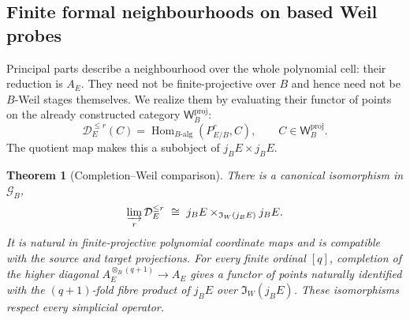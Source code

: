 \documentclass[11pt,a4paper]{article}
\numberwithin{algorithm}{section}
\numberwithin{equation}{section}
\newtheorem{theorem}{Theorem}[section]
\theoremstyle{definition}
\theoremstyle{remark}
\theoremstyle{plain}
\newcommand{\Hom}{\operatorname{Hom}}
\newcommand{\Weil}{\mathsf W}
\newcommand{\Geo}{\mathcal G_B}
\newcommand{\Shape}{\mathfrak I_W}
\theoremstyle{definition}
\theoremstyle{plain}
\begin{document}
\subsection{Finite formal neighbourhoods on based Weil probes}
\label{sec:formal-realization}
Principal parts describe a neighbourhood over the whole polynomial
cell: their reduction is $A_E$. They need not be finite-projective
over $B$ and hence need not be $B$-Weil stages themselves.
We realize them by evaluating their functor of points on the
already constructed category $\Weil_B^{\mathrm{proj}}$:
\[
 \mathcal D_E^{\le r}(C)
   =\Hom_{B\text{-alg}}(P^r_{E/B},C),
   \qquad C\in\Weil_B^{\mathrm{proj}}.
\]
The quotient map makes this a subobject of $j_BE\times j_BE$.

\begin{theorem}[Completion--Weil comparison]
\label{thm:completion-weil}
There is a canonical isomorphism in $\Geo$,
\begin{equation}\label{eq:completion-weil}
 \varinjlim_r\mathcal D_E^{\le r}
 \ \cong\ j_BE\times_{\Shape(j_BE)}j_BE.
\end{equation}
It is natural in finite-projective polynomial coordinate maps and
is compatible with the source and target projections.  For every
finite ordinal $[q]$, completion of the higher diagonal
$A_E^{\otimes_B(q+1)}\to A_E$ gives a functor of points
naturally identified with the $(q+1)$-fold fibre product of
$j_BE$ over $\Shape(j_BE)$.  These isomorphisms respect every
simplicial operator.
\end{theorem}
\end{document}
